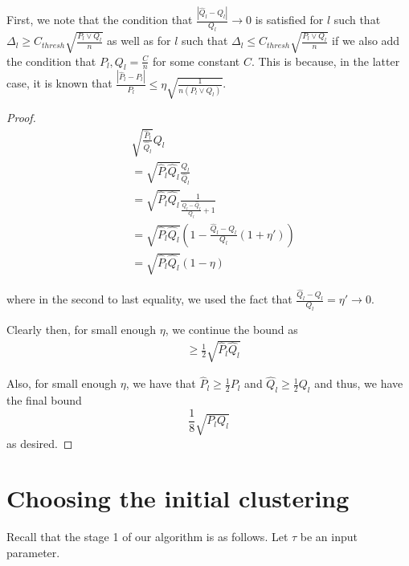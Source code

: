\documentclass{article}
\begin{document}
First, we note that the condition that $\frac{|\hat{Q}_l - Q_l|}{Q_l} \rightarrow 0$ is satisfied for $l$ such that $\Delta_l \geq C_{thresh}\sqrt{\frac{P_l \vee Q_l}{n}}$ as well as for $l$ such that $\Delta_l \leq C_{thresh} \sqrt{\frac{P_l \vee Q_l}{n}}$ if we also add the condition that $P_l, Q_l = \frac{C}{n}$ for some constant $C$. This is because, in the latter case, it is known that $\frac{|\hat{P}_l - P_l| }{P_l} \leq \eta \sqrt{\frac{1}{n (P_l \vee Q_l)}}$. 

\begin{proof}


\begin{align*}
& \sqrt{\frac{\hat{P}_l}{\hat{Q}_l} } Q_l \\
&= \sqrt{ \hat{P}_l \hat{Q}_l} \frac{Q_l}{\hat{Q}_l} \\
&= \sqrt{\hat{P}_l \hat{Q}_l} \frac{1}{ \frac{Q_l - \hat{Q}_l}{Q_l} + 1 } \\
&= \sqrt{\hat{P}_l \hat{Q}_l} 
  \left( 1 - \frac{\hat{Q}_l - Q_l}{Q_l} (1 + \eta') \right)  \\
&= \sqrt{\hat{P}_l \hat{Q}_l} (1 - \eta)
\end{align*}

where in the second to last equality, we used the fact that $\frac{\hat{Q}_l - Q_l}{Q_l} = \eta' \rightarrow 0$. 

Clearly then, for small enough $\eta$, we continue the bound as 
\begin{align*}
&\geq \frac{1}{2} \sqrt{ \hat{P}_l \hat{Q}_l} 
\end{align*}

Also, for small enough $\eta$, we have that $\hat{P}_l \geq \frac{1}{2} P_l$ and $\hat{Q}_l \geq \frac{1}{2} Q_l$ and thus, we have the final bound
\[
\frac{1}{8} \sqrt{ P_l Q_l}
\]
as desired. 

\end{proof}



\newpage
\section{Choosing the initial clustering}
\label{sec:initial_clustering}

Recall that the stage 1 of our algorithm is as follows. Let $\tau$ be an input parameter. 
\end{document}
